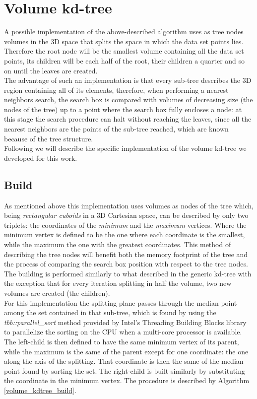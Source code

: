 \section{Volume kd-tree}
A possible implementation of the above-described algorithm uses as tree nodes volumes in the 3D space that splits the space in which the data set points lies. Therefore the root node will be the smallest volume containing all the data set points, its children will be each half of the root, their children a quarter and so on until the leaves are created.\\
The advantage of such an implementation is that every sub-tree describes the 3D region containing all of its elements, therefore, when performing a nearest neighbors search, the search box is compared with volumes of decreasing size (the nodes of the tree) up to a point where the search box fully encloses a node: at this stage the search procedure can halt without reaching the leaves, since all the nearest neighbors are the points of the sub-tree reached, which are known because of the tree structure.\\

Following we will describe the specific implementation of the volume kd-tree we developed for this work.
\subsection{Build}\label{sec:volumeKDBuild}
As mentioned above this implementation uses volumes as nodes of the tree which, being \textit{rectangular cuboids} in a 3D Cartesian space, can be described by only two triplets: the coordinates of the \textit{minimum} and the \textit{maximum} vertices. Where the minimum vertex is defined to be the one where each coordinate is the smallest, while the maximum the one with the greatest coordinates. This method of describing the tree nodes will benefit both the memory footprint of the tree and the process of comparing the search box position with respect to the tree nodes.\\
The building is performed similarly to what described in the generic kd-tree with the exception that for every iteration splitting in half the volume, two new volumes are created (the children).\\
For this implementation the splitting plane passes through the median point among the set contained in that sub-tree, which is found by using the \textit{tbb::parallel\_sort} method provided by Intel's Threading Building Blocks library \cite{intel_tbb} to parallelize the sorting on the CPU when a multi-core processor is available.\\
The left-child is then defined to have the same minimum vertex of its parent, while the maximum is the same of the parent except for one coordinate: the one along the axis of the splitting. That coordinate is then the same of the median point found by sorting the set. The right-child is built similarly by substituting the coordinate in the minimum vertex. The procedure is described by Algorithm \ref{volume_kdtree_build}.\\

